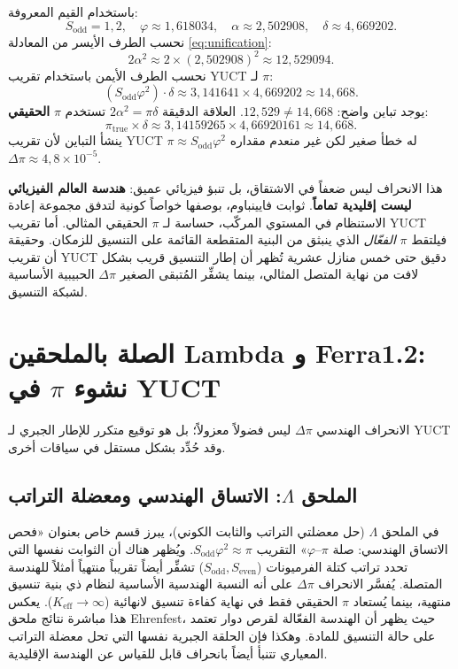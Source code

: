 \documentclass[12pt,a4paper]{article}
\begin{document}
	باستخدام القيم المعروفة:
	\[
	S_{\mathrm{odd}} = 1{,}2, \quad \varphi \approx 1{,}618034, \quad \alpha \approx 2{,}502908, \quad \delta \approx 4{,}669202.
	\]
	نحسب الطرف الأيسر من المعادلة \eqref{eq:unification}:
	\[
	2\alpha^2 \approx 2 \times (2{,}502908)^2 \approx 12{,}529094.
	\]
	نحسب الطرف الأيمن باستخدام تقريب YUCT لـ \(\pi\):
	\[
	(S_{\mathrm{odd}}\varphi^2) \cdot \delta \approx 3{,}141641 \times 4{,}669202 \approx 14{,}668.
	\]
	يوجد تباين واضح: \(12{,}529 \neq 14{,}668\). العلاقة الدقيقة \(2\alpha^2 = \pi \delta\) تستخدم \(\pi\) \textbf{الحقيقي}:
	\[
	\pi_{\mathrm{true}} \times \delta \approx 3{,}14159265 \times 4{,}66920161 \approx 14{,}668.
	\]
	ينشأ التباين لأن تقريب YUCT \(\pi \approx S_{\mathrm{odd}}\varphi^2\) له خطأ صغير لكن غير منعدم مقداره \(\Delta\pi \approx 4{,}8\times10^{-5}\).
	
	هذا الانحراف ليس ضعفاً في الاشتقاق، بل تنبؤ فيزيائي عميق: \textbf{هندسة العالم الفيزيائي ليست إقليدية تماماً}. ثوابت فايينباوم، بوصفها خواصاً كونية لتدفق مجموعة إعادة الاستنظام في المستوي المركّب، حساسة لـ \(\pi\) الحقيقي المثالي. أما تقريب YUCT فيلتقط \(\pi\) \textit{الفعّال} الذي ينبثق من البنية المتقطعة القائمة على التنسيق للزمكان. وحقيقة أن تقريب YUCT دقيق حتى خمس منازل عشرية تُظهر أن إطار التنسيق قريب بشكل لافت من نهاية المتصل المثالي، بينما يشفِّر المُتبقى الصغير \(\Delta\pi\) الحبيبية الأساسية لشبكة التنسيق.
	
	\section{الصلة بالملحقين Lambda و Ferra1.2: نشوء \(\pi\) في YUCT}
	
	الانحراف الهندسي \(\Delta\pi\) ليس فضولاً معزولاً؛ بل هو توقيع متكرر للإطار الجبري لـ YUCT وقد حُدِّد بشكل مستقل في سياقات أخرى.
	
	\subsection{الملحق \(\Lambda\): الاتساق الهندسي ومعضلة التراتب}
	
	في الملحق \(\Lambda\) (حل معضلتي التراتب والثابت الكوني)، يبرز قسم خاص بعنوان «فحص الاتساق الهندسي: صلة \(\pi\)–\(\varphi\)» التقريب \(S_{\mathrm{odd}}\varphi^2 \approx \pi\). ويُظهر هناك أن الثوابت نفسها التي تحدد تراتب كتلة الفرميونات (\(S_{\mathrm{odd}}, S_{\mathrm{even}}\)) تشفِّر أيضاً تقريباً منتهياً أمثلاً للهندسة المتصلة. يُفسَّر الانحراف \(\Delta\pi\) على أنه النسبة الهندسية الأساسية لنظام ذي بنية تنسيق منتهية، بينما يُستعاد \(\pi\) الحقيقي فقط في نهاية كفاءة تنسيق لانهائية (\(K_{\mathrm{eff}} \to \infty\)). يعكس هذا مباشرة نتائج ملحق Ehrenfest، حيث يظهر أن الهندسة الفعّالة لقرص دوار تعتمد على حالة التنسيق للمادة. وهكذا فإن الحلقة الجبرية نفسها التي تحل معضلة التراتب المعياري تتنبأ أيضاً بانحراف قابل للقياس عن الهندسة الإقليدية.
	
\end{document}

